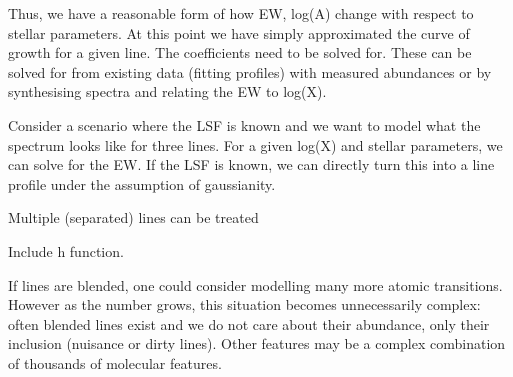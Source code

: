 \documentclass[useAMS,usenatbib]{mn2e}
\newcommand\tc{\textit{The Cannon}}
\begin{document}








Thus, we have a reasonable form of how EW, log(A) change with respect to
stellar parameters. At this point we have simply approximated the curve of growth
for a given line. The coefficients need to be solved for. These can be solved for
from existing data (fitting profiles) with measured abundances or by synthesising
spectra and relating the EW to log(X).


Consider a scenario where the LSF is known and we want to model what the
spectrum looks like for three lines. For a given log(X) and stellar parameters,
we can solve for the EW. If the LSF is known, we can directly turn this into a
line profile under the assumption of gaussianity.

Multiple (separated) lines can be treated

Include h function.

If lines are blended, one could consider modelling many more atomic transitions.
However as the number grows, this situation becomes unnecessarily complex:
often blended lines exist and we do not care about their abundance, only their
inclusion (nuisance or dirty lines). Other features may be a complex combination
of thousands of molecular features.
\end{document}
